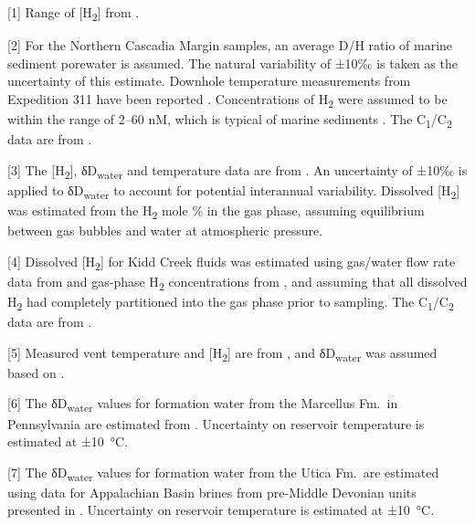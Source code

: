 \begin{table}
\begin{threeparttable}
\begin{tablenotes}
			\item {[}1{]} Range of {[}H\textsubscript{2}{]} from \textcite{Janssen_2010_AFST}.
			
			\item {[}2{]} For the Northern Cascadia Margin samples, an average D/H ratio
			of marine sediment porewater \parencite[+5‰,][]{Friedman+Hardcastle_1988_JGR} is assumed. The
			natural variability of ±10‰ is taken as the uncertainty of this
			estimate. Downhole temperature measurements from Expedition 311 have
			been reported \parencite{IODP_x311_Proceedings}. Concentrations of H\textsubscript{2} were
			assumed to be within the range of 2--60 nM, which is typical of marine
			sediments \parencite{Lin++_2012_GCA}. The C\textsubscript{1}/C\textsubscript{2} data
			are from \textcite{Pohlman++_2009_EPSL}.
			
			\item {[}3{]} The {[}H\textsubscript{2}{]}, δD­\textsubscript{water} and
			temperature data are from \textcite{Morrill++_2013_GCA}. An uncertainty of
			±10‰ is applied to δD\textsubscript{water} to account for potential
			interannual variability. Dissolved {[}H\textsubscript{2}{]} was
			estimated from the H\textsubscript{2} mole \% in the gas phase,
			assuming equilibrium between gas bubbles and water at atmospheric pressure.
			
			\item {[}4{]} Dissolved {[}H\textsubscript{2}{]} for Kidd Creek fluids was
			estimated using gas/water flow rate data from \textcite{Holland++_2013_N}
			and gas-phase H\textsubscript{2} concentrations from \textcite{SherwoodLollar++_2008_GCA}, and assuming that all dissolved H\textsubscript{2} had
			completely partitioned into the gas phase prior to sampling. The
			C\textsubscript{1}/C\textsubscript{2} data are from \textcite{SherwoodLollar++_2002_N}.
			
			\item {[}5{]} Measured vent temperature and {[}H\textsubscript{2}{]} are from \textcite{Reeves++_2014_PNAS}, and δD\textsubscript{water} was assumed based on \textcite{Shanks++_1995_AGU-GM}.
			
			\item {[}6{]} The δD\textsubscript{water} values for formation water from the
			Marcellus Fm.\ in Pennsylvania are estimated from \textcite{Rowan++_2014_AAPGB}. Uncertainty on reservoir temperature is estimated at ±10~°C.
			
			\item {[}7{]} The δD\textsubscript{water} values for formation water from the
			Utica Fm.\ are estimated using data for Appalachian Basin brines from
			pre-Middle Devonian units presented in \textcite{Warner++_2012_PNAS}.
			Uncertainty on reservoir temperature is estimated at ±10~°C.


		\end{tablenotes}

	\end{threeparttable}
\end{table}
